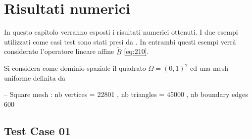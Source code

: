 \section{Risultati numerici}
\label{chap:Results}
In questo capitolo verranno esposti i risultati numerici ottenuti.
I due esempi utilizzati come casi test sono stati presi da \cite{MAIN}.
In entrambi questi esempi verrà considerato l'operatore lineare affine $\tilde{B}$ \eqref{eq:210}.
\par
Si considera come dominio spaziale il quadrato $ \Omega = (0,1)^2$ ed una mesh uniforme definita da
\begin{Code}[caption={mesh in spazio square( 150, 150, flags=1 )}]
-- Square mesh : nb vertices  = 22801 ,  nb triangles = 45000 ,  nb boundary edges 600
\end{Code}

\subsection{Test Case 01}

